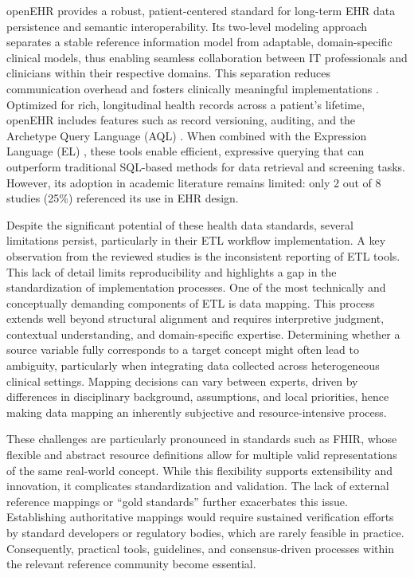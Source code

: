 openEHR provides a robust, patient-centered standard for long-term EHR data persistence and semantic interoperability. Its two-level modeling approach \cite{wulff_transformation_2021} separates a stable reference information model from adaptable, domain-specific clinical models, thus enabling seamless collaboration between IT professionals and clinicians \cite{li_configurable_2022} within their respective domains. This separation reduces communication overhead and fosters clinically meaningful implementations \cite{wulff_transformation_2021}. Optimized for rich, longitudinal health records across a patient's lifetime, openEHR includes features such as record versioning, auditing, and the Archetype Query Language (AQL) \cite{oliveira_openehr_2021}. When combined with the Expression Language (EL) \cite{li_patient-screening_2021}, these tools enable efficient, expressive querying that can outperform traditional SQL-based methods for data retrieval and screening tasks. However, its adoption in academic literature remains limited: only 2 \cite{gomes_representation_2021,oliveira_openehr_2021} out of 8 studies (25\%) referenced its use in EHR design.

Despite the significant potential of these health data standards, several limitations persist, particularly in their ETL workflow implementation. A key observation from the reviewed studies is the inconsistent reporting of ETL tools. This lack of detail limits reproducibility and highlights a gap in the standardization of implementation processes. One of the most technically and conceptually demanding components of ETL is data mapping. This process extends well beyond structural alignment and requires interpretive judgment, contextual understanding, and domain-specific expertise. Determining whether a source variable fully corresponds to a target concept might often lead to ambiguity, particularly when integrating data collected across heterogeneous clinical settings. Mapping decisions can vary between experts, driven by differences in disciplinary background, assumptions, and local priorities, hence making data mapping an inherently subjective and resource-intensive process.

These challenges are particularly pronounced in standards such as FHIR, whose flexible and abstract resource definitions allow for multiple valid representations of the same real-world concept. While this flexibility supports extensibility and innovation, it complicates standardization and validation. The lack of external reference mappings or ``gold standards'' further exacerbates this issue. Establishing authoritative mappings would require sustained verification efforts by standard developers or regulatory bodies, which are rarely feasible in practice. Consequently, practical tools, guidelines, and consensus-driven processes within the relevant reference community become essential.

